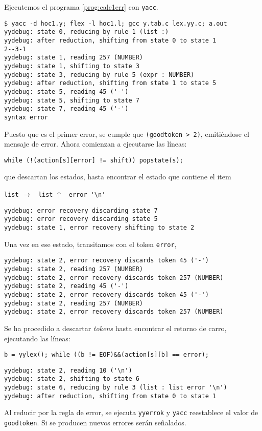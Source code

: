 \begin{execution}
Ejecutemos el programa \ref{prog:calc1err} con \verb|yacc|.
\begin{verbatim}
$ yacc -d hoc1.y; flex -l hoc1.l; gcc y.tab.c lex.yy.c; a.out
yydebug: state 0, reducing by rule 1 (list :)
yydebug: after reduction, shifting from state 0 to state 1
2--3-1
yydebug: state 1, reading 257 (NUMBER)
yydebug: state 1, shifting to state 3
yydebug: state 3, reducing by rule 5 (expr : NUMBER)
yydebug: after reduction, shifting from state 1 to state 5
yydebug: state 5, reading 45 ('-')
yydebug: state 5, shifting to state 7
yydebug: state 7, reading 45 ('-')
syntax error
\end{verbatim}
Puesto que es el primer error, se cumple que 
\verb|(goodtoken > 2)|, emitiéndose el mensaje de error.
Ahora comienzan a ejecutarse las líneas:

\begin{center}
\noindent \verb|while (!(action[s][error] != shift)) popstate(s);|
\end{center}

\noindent que descartan los estados, hasta encontrar el estado
que contiene el item 

\verb|list| $\rightarrow$ \verb| list| $\uparrow$ \verb| error '\n'|  
\begin{verbatim}
yydebug: error recovery discarding state 7
yydebug: error recovery discarding state 5
yydebug: state 1, error recovery shifting to state 2
\end{verbatim}
Una vez en ese estado, transitamos con el token \verb|error|,
\begin{verbatim}
yydebug: state 2, error recovery discards token 45 ('-')
yydebug: state 2, reading 257 (NUMBER)
yydebug: state 2, error recovery discards token 257 (NUMBER)
yydebug: state 2, reading 45 ('-')
yydebug: state 2, error recovery discards token 45 ('-')
yydebug: state 2, reading 257 (NUMBER)
yydebug: state 2, error recovery discards token 257 (NUMBER)
\end{verbatim}
Se ha procedido a descartar \emph{tokens} hasta encontrar el retorno
de carro, ejecutando las líneas:
\begin{center}
\verb|b = yylex(); while ((b != EOF)&&(action[s][b] == error);|
\end{center}

\begin{verbatim}
yydebug: state 2, reading 10 ('\n')
yydebug: state 2, shifting to state 6
yydebug: state 6, reducing by rule 3 (list : list error '\n')
yydebug: after reduction, shifting from state 0 to state 1
\end{verbatim}
Al reducir por la regla de error, se ejecuta \verb|yyerrok|
y \verb|yacc| reestablece el valor de \verb|goodtoken|.
Si se producen nuevos errores serán señalados.
\end{execution}

